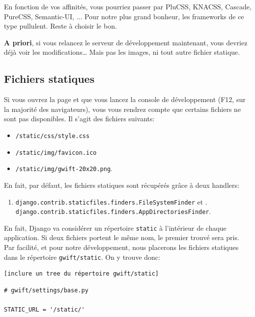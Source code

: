 \documentclass[11pt]{amsbook}
\begin{document}
En fonction de vos affinités, vous pourriez passer par PluCSS, KNACSS, Cascade, PureCSS, Semantic-UI, ... 
Pour notre plus grand bonheur, les frameworks de ce type pullulent.
Reste à choisir le bon.

\textbf{A priori}, si vous relancez le serveur de développement maintenant, vous devriez déjà voir les modifications…​ Mais pas les images, ni tout autre fichier statique.


\hypertarget{x-fichiers-statiques}{\subsection{Fichiers statiques}}
Si vous ouvrez la page et que vous lancez la console de développement (F12, sur la majorité des navigateurs), vous vous rendrez compte que certains fichiers ne sont pas disponibles. Il s’agit des fichiers suivants:


\begin{itemize}

\item \texttt{/static/css/style.css}

\item \texttt{/static/img/favicon.ico}

\item \texttt{/static/img/gwift-20x20.png}.

\end{itemize}


En fait, par défaut, les fichiers statiques sont récupérés grâce à deux handlers:


\begin{enumerate}

\item{\texttt{django.contrib.staticfiles.finders.FileSystemFinder} et . \texttt{django.contrib.staticfiles.finders.AppDirectoriesFinder}.}

\end{enumerate}


En fait, Django va considérer un répertoire \texttt{static} à l’intérieur de chaque application. Si deux fichiers portent le même nom, le premier trouvé sera pris. Par facilité, et pour notre développement, nous placerons les fichiers statiques dans le répertoire \texttt{gwift/static}. On y trouve donc:


\begin{verbatim}
[inclure un tree du répertoire gwift/static]
\end{verbatim}

\begin{verbatim}
# gwift/settings/base.py

STATIC_URL = '/static/'
\end{verbatim}
\end{document}
